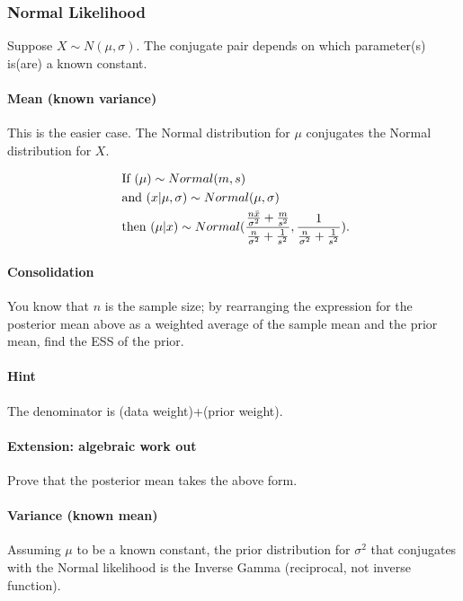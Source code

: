 \documentclass{article}
\begin{document}
\subsubsection{Normal Likelihood}
Suppose $X \sim N(\mu,\sigma)$.
The conjugate pair depends on which parameter(s) is(are) a known constant.
\paragraph{Mean (known variance)}
This is the easier case. The Normal distribution for $\mu$ conjugates the Normal distribution for $X$.

\begin{equation}
\begin{split}
    &\ \text{If } (\mu) \sim {Normal(m,s)} \\
    &\ \text{and } (x|\mu,\sigma) \sim Normal(\mu,\sigma) \\
    &\ \text{then } (\mu|x) \sim Normal(
    \frac{
    \frac {n \Bar{x}}{\sigma^2} + \frac {m}{s^2}
    }
    {\frac{n}{\sigma^2}+ \frac{1}{s^2}},
    \frac{1}
    {\frac{n}{\sigma^2}+ \frac{1}{s^2}}). \\
\end{split}
\end{equation}

\begin{Exercise}
    \paragraph{Consolidation}
    You know that $n$ is the sample size; by rearranging the expression for the posterior mean above as a weighted average of the sample mean and the prior mean, find the ESS of the prior.
    
    \paragraph{Hint} The denominator is (data weight)+(prior weight).
\end{Exercise}

\newpage
\begin{Exercise}
    \paragraph{Extension: algebraic work out}
    Prove that the posterior mean takes the above form.
\end{Exercise}


\paragraph{Variance (known mean)}
Assuming $\mu$ to be a known constant, the prior distribution for $\sigma^2$ that conjugates with the Normal likelihood is the Inverse Gamma (reciprocal, not inverse function).
\end{document}
